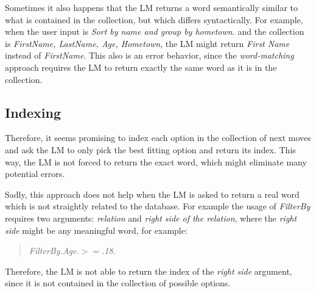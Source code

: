 \documentclass[12pt]{article}
\begin{document}
Sometimes it also happens that the LM returns a word semantically similar to what is contained in the collection, but which differs syntactically. For example, when the user input is \textit{Sort by name and group by hometown.} and the collection is \textit{FirstName, LastName, Age, Hometown}, the LM might return \textit{First Name} instead of \textit{FirstName}. This also is an error behavior, since the \textit{word-matching} approach requires the LM to return exactly the same word as it is in the collection.

\subsection{Indexing}

Therefore, it seems promising to index each option in the collection of next moves and ask the LM to only pick the best fitting option and return its index. This way, the LM is not forced to return the exact word, which might eliminate many potential errors. 

Sadly, this approach does not help when the LM is asked to return a real word which is not straightly related to the database. For example the usage of \textit{FilterBy} requires two arguments: \textit{relation} and \textit{right side of the relation}, where the \textit{right side} might be any meaningful word, for example:
\begin{quotation}
    \textit{FilterBy.Age.\begin{math}>=\end{math}.18.}
\end{quotation}
Therefore, the LM is not able to return the index of the \textit{right side} argument, since it is not contained in the collection of possible options.

\pagebreak
\end{document}
